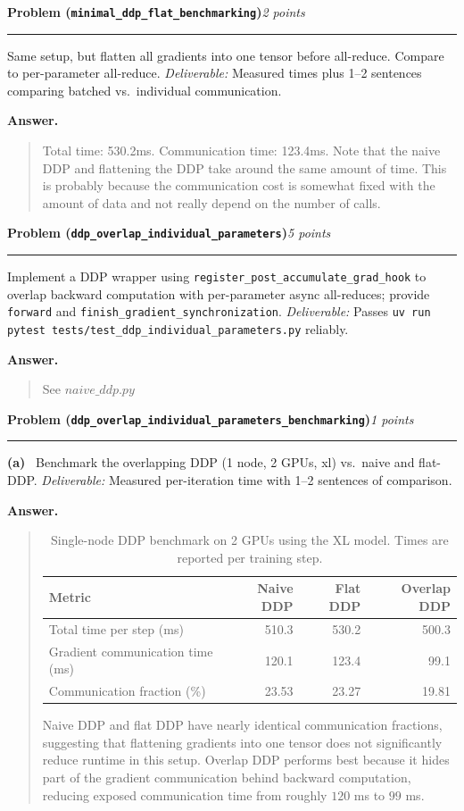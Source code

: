 \documentclass[11pt]{article}
\newcommand{\problem}[2]{%
  \vspace{0.6em}%
  \noindent\textbf{Problem (\texttt{#1})}\hfill\textit{#2 points}\par%
  \vspace{0.2em}\hrule\vspace{0.4em}%
}
\newcommand{\subq}[1]{\vspace{0.3em}\noindent\textbf{(#1)}\ }
\newcommand{\deliverable}[1]{\vspace{0.2em}\noindent\textit{Deliverable:} #1\par}
\newenvironment{answer}{%
  \vspace{0.3em}%
  \noindent\textbf{Answer.}\begin{quote}%
}{%
  \end{quote}\vspace{0.4em}%
}
\begin{document}
\problem{minimal\_ddp\_flat\_benchmarking}{2}
Same setup, but flatten all gradients into one tensor before all-reduce. Compare to per-parameter all-reduce.
\deliverable{Measured times plus 1--2 sentences comparing batched vs.\ individual communication.}
\begin{answer}
Total time: 530.2ms. Communication time: 123.4ms. Note that the naive DDP and flattening the DDP take around the same amount of time.
This is probably because the communication cost is somewhat fixed with the amount of data and not really depend on the number of calls.
\end{answer}


\problem{ddp\_overlap\_individual\_parameters}{5}
Implement a DDP wrapper using \texttt{register\_post\_accumulate\_grad\_hook} to overlap backward computation with per-parameter async all-reduces; provide \texttt{forward} and \texttt{finish\_gradient\_synchronization}.
\deliverable{Passes \texttt{uv run pytest tests/test\_ddp\_individual\_parameters.py} reliably.}
\begin{answer}
  See $naive\_ddp.py$
\end{answer}


\problem{ddp\_overlap\_individual\_parameters\_benchmarking}{1}

\subq{a} Benchmark the overlapping DDP (1 node, 2 GPUs, xl) vs.\ naive and flat-DDP.
\deliverable{Measured per-iteration time with 1--2 sentences of comparison.}
\begin{answer}
  \begin{table}[h]
  \centering
  \begin{tabular}{lrrr}
  \toprule
  Metric & Naive DDP & Flat DDP & Overlap DDP \\
  \midrule
  Total time per step (ms) & 510.3 & 530.2 & 500.3 \\
  Gradient communication time (ms) & 120.1 & 123.4 & 99.1 \\
  Communication fraction (\%) & 23.53 & 23.27 & 19.81 \\
  \bottomrule
  \end{tabular}
  \caption{Single-node DDP benchmark on 2 GPUs using the XL model. Times are reported per training step.}
  \label{tab:ddp_training_step_breakdown}
  \end{table}
  
  Naive DDP and flat DDP have nearly identical communication fractions, suggesting that flattening gradients into one tensor does not significantly reduce runtime in this setup. Overlap DDP performs best because it hides part of the gradient communication behind backward computation, reducing exposed communication time from roughly $120$ ms to $99$ ms.
  \end{answer}
\end{document}

